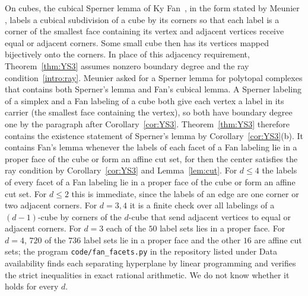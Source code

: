 \documentclass[11pt]{amsart}
\theoremstyle{definition}
\theoremstyle{remark}
\numberwithin{equation}{section}
\begin{document}
On cubes, the cubical Sperner lemma of Ky Fan~\cite{Fan60}, in the form stated by Meunier \cite[Theorem~5]{Meu08}, labels a cubical subdivision of a cube by its corners so that each label is a corner of the smallest face containing its vertex and adjacent vertices receive equal or adjacent corners. Some small cube then has its vertices mapped bijectively onto the corners. In place of this adjacency requirement, Theorem~\ref{thm:YS3} assumes nonzero boundary degree and the ray condition~\eqref{intro:ray}. Meunier \cite[\S3.1]{Meu08} asked for a Sperner lemma for polytopal complexes that contains both Sperner's lemma and Fan's cubical lemma. A Sperner labeling of a simplex and a Fan labeling of a cube both give each vertex a label in its carrier (the smallest face containing the vertex), so both have boundary degree one by the paragraph after Corollary~\ref{cor:YS3}. Theorem~\ref{thm:YS3} therefore contains the existence statement of Sperner's lemma by Corollary~\ref{cor:YS3}(b). It contains Fan's lemma whenever the labels of each facet of a Fan labeling lie in a proper face of the cube or form an affine cut set, for then the center satisfies the ray condition by Corollary~\ref{cor:YS3} and Lemma~\ref{lem:cut}. For $d\le4$ the labels of every facet of a Fan labeling lie in a proper face of the cube or form an affine cut set. For $d\le2$ this is immediate, since the labels of an edge are one corner or two adjacent corners. For $d=3,4$ it is a finite check over all labelings of a $(d-1)$-cube by corners of the $d$-cube that send adjacent vertices to equal or adjacent corners. For $d=3$ each of the $50$ label sets lies in a proper face. For $d=4$, $720$ of the $736$ label sets lie in a proper face and the other $16$ are affine cut sets; the program \texttt{code/fan\_facets.py} in the repository listed under Data availability finds each separating hyperplane by linear programming and verifies the strict inequalities in exact rational arithmetic. We do not know whether it holds for every $d$.
\end{document}
